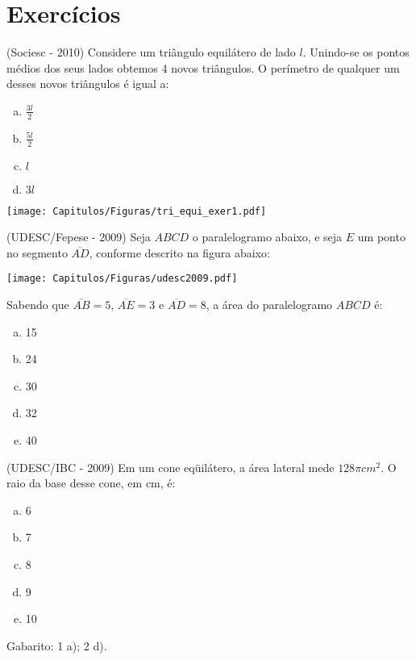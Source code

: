 
\section{Exercícios}

\begin{exer}
 (Sociesc - 2010) Considere um triângulo equilátero de lado $l$. Unindo-se os pontos médios dos seus lados obtemos 4 novos triângulos. O perímetro de qualquer um desses novos triângulos é igual a:

 \begin{multicols}{2}

 \begin{enumerate}[a)]
  \item $\frac{3l}{2}$
  \item $\frac{5l}{2}$
  \item $l$
  \item $3l$
 \end{enumerate}

 \texttt{[image: Capitulos/Figuras/tri\_equi\_exer1.pdf]}

 \end{multicols}
 \end{exer}

  \begin{exer}
 (UDESC/Fepese - 2009) Seja $ABCD$ o paralelogramo abaixo, e seja $E$ um ponto no segmento $\overline{AD}$, conforme descrito na figura abaixo:

  \begin{center}
 \texttt{[image: Capitulos/Figuras/udesc2009.pdf]}
 \end{center}

  Sabendo que $\overline{AB} = 5$, $\overline{AE} = 3$ e $\overline{AD} = 8$, a área do paralelogramo $ABCD$ é:
  \begin{enumerate}[a)]
  \item 15
  \item 24
  \item 30
  \item 32
  \item 40
 \end{enumerate}
 \end{exer}

 \begin{exer}
 (UDESC/IBC - 2009) Em um cone eqüilátero, a área lateral mede $128 \pi cm^2$. O raio da base desse cone, em cm, é:
 \begin{enumerate}[a)]
  \item 6
  \item 7
  \item 8
  \item 9
  \item 10
 \end{enumerate}
 \end{exer}

 Gabarito: 1 a); 2 d).
